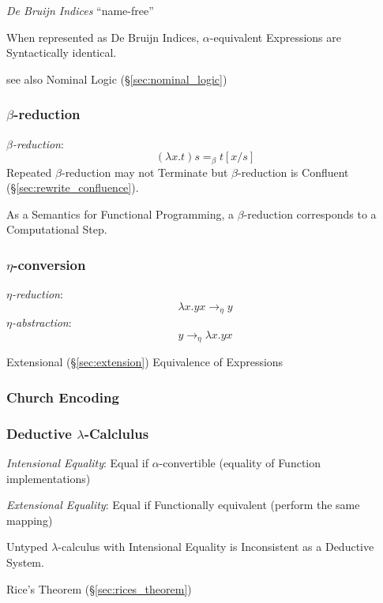 \emph{De Bruijn Indices} ``name-free''

When represented as De Bruijn Indices, $\alpha$-equivalent Expressions
are Syntactically identical.

see also Nominal Logic (\S\ref{sec:nominal_logic})



\subsubsection{$\beta$-reduction}\label{sec:beta_reduction}

\emph{$\beta$-reduction}:
\[
  (\lambda x.t)s =_\beta t[x/s]
\]
Repeated $\beta$-reduction may not Terminate but $\beta$-reduction is
Confluent (\S\ref{sec:rewrite_confluence}).

As a Semantics for Functional Programming, a $\beta$-reduction
corresponds to a Computational Step.



\subsubsection{$\eta$-conversion}\label{sec:eta_conversion}

\emph{$\eta$-reduction}:
\[
  \lambda x.y x \rightarrow_\eta y
\]
\emph{$\eta$-abstraction}:
\[
  y \rightarrow_\eta \lambda x.y x
\]

Extensional (\S\ref{sec:extension}) Equivalence of Expressions



\subsubsection{Church Encoding}\label{sec:church_encoding}

\subsubsection{Deductive $\lambda$-Calclulus}\label{sec:deductive_lambda}

\emph{Intensional Equality}: Equal if $\alpha$-convertible (equality
of Function implementations)

\emph{Extensional Equality}: Equal if Functionally equivalent (perform
the same mapping)

Untyped $\lambda$-calculus with Intensional Equality is Inconsistent
as a Deductive System.

Rice's Theorem (\S\ref{sec:rices_theorem})

